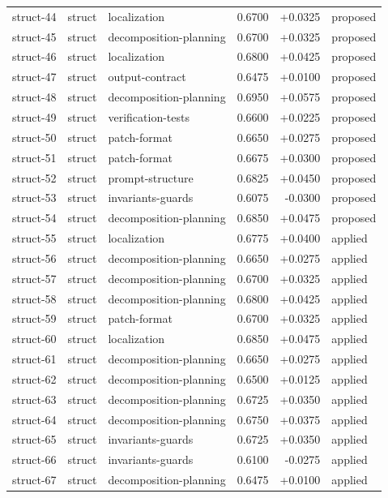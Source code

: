 \begin{center}
\begin{longtable}{llp{5.2cm}rrl}
struct-44 & struct & localization & 0.6700 & +0.0325 & proposed \\
struct-45 & struct & decomposition-planning & 0.6700 & +0.0325 & proposed \\
struct-46 & struct & localization & 0.6800 & +0.0425 & proposed \\
struct-47 & struct & output-contract & 0.6475 & +0.0100 & proposed \\
struct-48 & struct & decomposition-planning & 0.6950 & +0.0575 & proposed \\
struct-49 & struct & verification-tests & 0.6600 & +0.0225 & proposed \\
struct-50 & struct & patch-format & 0.6650 & +0.0275 & proposed \\
struct-51 & struct & patch-format & 0.6675 & +0.0300 & proposed \\
struct-52 & struct & prompt-structure & 0.6825 & +0.0450 & proposed \\
struct-53 & struct & invariants-guards & 0.6075 & -0.0300 & proposed \\
struct-54 & struct & decomposition-planning & 0.6850 & +0.0475 & proposed \\
struct-55 & struct & localization & 0.6775 & +0.0400 & applied \\
struct-56 & struct & decomposition-planning & 0.6650 & +0.0275 & applied \\
struct-57 & struct & decomposition-planning & 0.6700 & +0.0325 & applied \\
struct-58 & struct & decomposition-planning & 0.6800 & +0.0425 & applied \\
struct-59 & struct & patch-format & 0.6700 & +0.0325 & applied \\
struct-60 & struct & localization & 0.6850 & +0.0475 & applied \\
struct-61 & struct & decomposition-planning & 0.6650 & +0.0275 & applied \\
struct-62 & struct & decomposition-planning & 0.6500 & +0.0125 & applied \\
struct-63 & struct & decomposition-planning & 0.6725 & +0.0350 & applied \\
struct-64 & struct & decomposition-planning & 0.6750 & +0.0375 & applied \\
struct-65 & struct & invariants-guards & 0.6725 & +0.0350 & applied \\
struct-66 & struct & invariants-guards & 0.6100 & -0.0275 & applied \\
struct-67 & struct & decomposition-planning & 0.6475 & +0.0100 & applied \\

\end{longtable}
\end{center}
